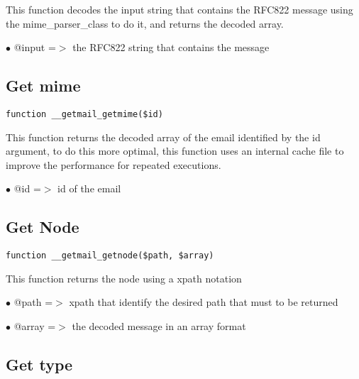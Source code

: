 \documentclass[a4paper]{book}
\begin{document}
This function decodes the input string that contains the RFC822 message
using the mime\_parser\_class to do it, and returns the decoded array.

\begin{compactitem}
\item[\color{myblue}$\bullet$] @input =$>$ the RFC822 string that contains the message
\end{compactitem}

\hypertarget{toc39}{}
\subsection{Get mime}

\begin{lstlisting}
function __getmail_getmime($id)
\end{lstlisting}

This function returns the decoded array of the email identified by the id
argument, to do this more optimal, this function uses an internal cache
file to improve the performance for repeated executions.

\begin{compactitem}
\item[\color{myblue}$\bullet$] @id =$>$ id of the email
\end{compactitem}

\hypertarget{toc40}{}
\subsection{Get Node}

\begin{lstlisting}
function __getmail_getnode($path, $array)
\end{lstlisting}

This function returns the node using a xpath notation

\begin{compactitem}
\item[\color{myblue}$\bullet$] @path  =$>$ xpath that identify the desired path that must to be returned
\item[\color{myblue}$\bullet$] @array =$>$ the decoded message in an array format
\end{compactitem}

\hypertarget{toc41}{}
\subsection{Get type}
\end{document}
